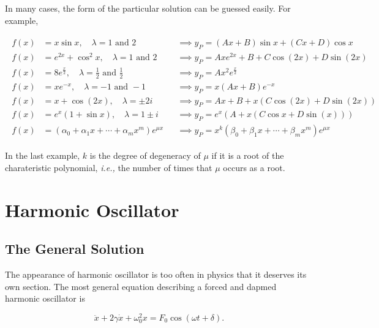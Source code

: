 \documentclass[english,a4paper,12pt]{report}
\begin{document}
In many cases, the form of the particular solution can be guessed easily. For example,  

\begin{align} 
    \begin{aligned}
       f(x) &= x\sin x, \quad  \lambda = 1 \text { and } 2 &&\implies y_{P} = (Ax+B)\sin x+(Cx+D)\cos x \\
       f(x) &= e^{2x}+\cos ^2x, \quad \lambda = 1 \text { and } 2 &&\implies y_{P} = Axe^{2x}+B+C \cos (2x)+D \sin (2x) \\
       f(x) &= 8e^{\frac{x}{2} }, \quad \lambda = \frac{1}{2} \text { and } \frac{1}{2} &&\implies y_{P} = Ax^2e^{\frac{x}{2} }\\
       f(x) &= xe^{-x}, \quad \lambda = -1 \text { and } -1 &&\implies y_{P} = x(Ax+B)e^{-x} \\
       f(x) &= x + \cos (2x), \quad \lambda = \pm 2i &&\implies y_{P} = Ax+B+x(C\cos (2x)+D\sin (2x)) \\      
       f(x) &= e^{x}(1+\sin x), \quad \lambda = 1 \pm i &&\implies y_{P} = e^{x} (A+x(C\cos x+D\sin (x)))\\
       f(x) &= (\alpha _{0}+\alpha _{1}x+\cdots +\alpha _{m}x^{m}    )e^{\mu x} &&\implies y_{P} = x^{k}(\beta _{0}+\beta _{1}x+\cdots +\beta _{m}x^{m})e^{\mu x}     
    \end{aligned}
\end{align} 

In the last example, \(k\) is the degree of degeneracy of \(\mu \) if it is a root of the charateristic polynomial, \textit{i.e.,} the number of times that \(\mu \) occurs as a root.  



\section{Harmonic Oscillator}

\subsection{The General Solution} \label{gensol} 

The appearance of harmonic oscillator is too often in physics that it deserves its own section. The most general equation describing a forced and dapmed harmonic oscillator is 

\begin{equation}
    \ddot{x}  + 2\gamma \dot{x}  + \omega _{0} ^2 x = F_0 \cos(\omega t+\delta ). 
\end{equation}
\end{document}
